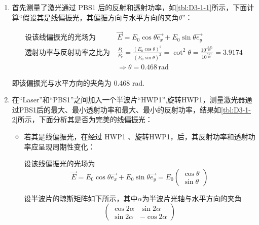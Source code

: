 \documentclass[dvipsnames, svgnames,a4paper,11pt]{article}
\begin{document}
		\begin{enumerate}
			\item 首先测量了激光通过 PBS1 后的反射和透射功率，如\cref{tbl:D3-1-1}所示，下面计算“假设其是线偏振光，其偏振方向与水平方向的夹角$\theta$”：

				\begin{align}
					\text{设该线偏振光的光场为} \ & \vec{E} = E_0 \cos\theta \vec{e_x} + E_0 \sin\theta \vec{e_y} \nonumber \\
					\text{透射功率与反射功率之比为} \ & \frac{P_t}{P_r} = \frac{(E_0 \cos\theta)^2}{(E_0 \sin\theta)^2} = \cot^2\theta = \frac{10^{\frac{15.05}{10}}}{10^{\frac{9.12}{10}}} = 3.9174 \nonumber \\
					& \Rightarrow \theta = 0.468 \, \mathrm{rad} \nonumber
				\end{align}

			即该偏振光与水平方向的夹角为 0.468 rad.

			\item 在“Laser”和“PBS1”之间加入一个半波片“HWP1”,旋转HWP1，测量激光器通过PBS1后的最大、最小透射功率和最大、最小的反射功率，结果如\cref{tbl:D3-1-2}所示，下面分析其是否为完美的线偏振光：
				\begin{itemize}
					\item 若其是线偏振光，在经过 HWP1 、旋转HWP1，后，其反射功率和透射功率应呈现周期性变化：
					
					设该线偏振光的光场为 
					$$ \vec{E} = E_0 \cos\theta \vec{e_x} + E_0 \sin\theta \vec{e_y} = E_0
					\begin{pmatrix}
						\cos\theta	\\
						\sin\theta
					\end{pmatrix} 
					$$

					设半波片的琼斯矩阵如下所示，其中$\alpha$为半波片光轴与水平方向的夹角 
					$$ \begin{pmatrix}
					 		\cos2\alpha		&\sin2\alpha	\\
							\sin2\alpha		&-\cos2\alpha
					 	\end{pmatrix} 
					$$


\end{itemize}
\end{enumerate}
\end{document}
